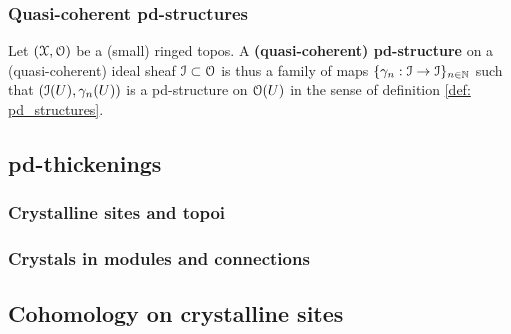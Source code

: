         \subsubsection{Quasi-coherent pd-structures}
            \begin{definition} \label{def: quasi_coherent_pd_structures}
                Let $(\mathcal{X}, \mathcal{O})$ be a (small) ringed topos. A \textbf{(quasi-coherent) pd-structure} on a (quasi-coherent) ideal sheaf $\mathcal{I} \subset \mathcal{O}$ is thus a family of maps $\{\gamma_n: \mathcal{I} \to \mathcal{I}\}_{n \in \mathbb{N}}$ such that $(\mathcal{I}(U), \gamma_n(U))$ is a pd-structure on $\mathcal{O}(U)$ in the sense of definition \ref{def: pd_structures}. 
            \end{definition}
                
    \subsection{pd-thickenings}
        \subsubsection{Crystalline sites and topoi}
        
        \subsubsection{Crystals in modules and connections}
        
    \subsection{Cohomology on crystalline sites}